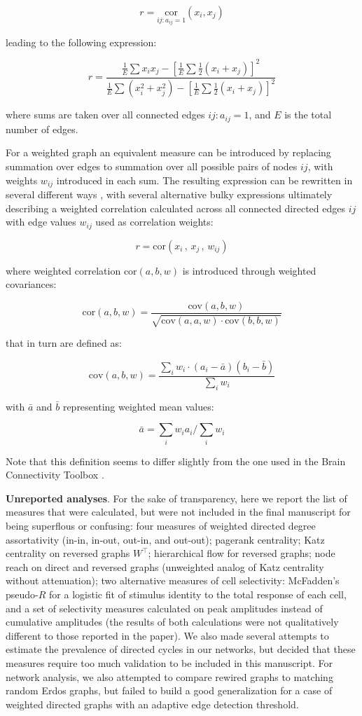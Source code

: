 \documentclass{article}
\begin{document}
\[ r=\underset{ij: a_{ij}=1}{\text{cor}}(x_i,x_j) \]

leading to the following expression:

\[ r = \frac{\frac{1}{E} \sum{x_i x_j} - [\frac{1}{E} \sum{\frac{1}{2}(x_i+x_j)}]^2} {\frac{1}{E} \sum{(x_i^2+x_j^2)}-[\frac{1}{E} \sum{\frac{1}{2}(x_i+x_j)}]^2} \]

where sums are taken over all connected edges $ij: a_{ij}=1$, and $E$ is the total number of edges.

For a weighted graph an equivalent measure can be introduced by replacing summation over edges to summation over all possible pairs of nodes $ij$, with weights $w_{ij}$ introduced in each sum. The resulting expression can be rewritten in several different ways \citep{newman2003mixing,leung2007weighted,farine2014weighted,teller2014assortative}, with several alternative bulky expressions ultimately describing a weighted correlation calculated across all connected directed edges $ij$ with edge values $w_{ij}$ used as correlation weights:

\[ r=\text{cor}(x_i \, , \, x_j \, , \, w_{ij}) \]

where weighted correlation $\text{cor}(a,b,w)$ is introduced through weighted covariances: 

\[ \text{cor}(a,b,w) = \frac{\text{cov}(a,b,w)}{\sqrt{\text{cov}(a,a,w) \cdot \text{cov}(b,b,w)}} \]

that in turn are defined as: 

\[ \text{cov}(a,b,w) = \frac{\sum_i{w_i \cdot (a_i-\bar{a})(b_i-\bar{b})}}{\sum_i{w_i}} \]

with $\bar{a}$ and $\bar{b}$ representing weighted mean values: 

\[ \bar{a}=\sum_i{w_i a_i}/\sum_i{w_i} \]

Note that this definition seems to differ slightly from the one used in the Brain Connectivity Toolbox \citep{rubinov2010toolbox}.

\textbf{Unreported analyses}. For the sake of transparency, here we report the list of measures that were calculated, but were not included in the final manuscript for being superflous or confusing: four measures of weighted directed degree assortativity (in-in, in-out, out-in, and out-out); pagerank centrality; Katz centrality on reversed graphs $W^\top$; hierarchical flow for reversed graphs; node reach on direct and reversed graphs (unweighted analog of Katz centrality without attenuation); two alternative measures of cell selectivity: McFadden’s pseudo-$R$ for a logistic fit of stimulus identity to the total response of each cell, and a set of selectivity measures calculated on peak amplitudes instead of cumulative amplitudes (the results of both calculations were not qualitatively different to those reported in the paper). We also made several attempts to estimate the prevalence of directed cycles in our networks, but decided that these measures require too much validation to be included in this manuscript. For network analysis, we also attempted to compare rewired graphs to matching random Erdos graphs, but failed to build a good generalization for a case of weighted directed graphs with an adaptive edge detection threshold.
\end{document}
